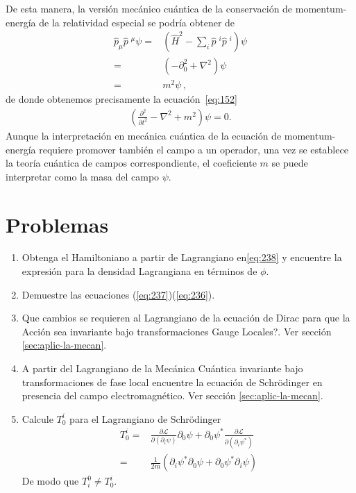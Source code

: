 De esta manera, la versión mecánico cuántica de la conservación de momentum-energía de la relatividad especial se podría obtener de
\begin{align}
  \widehat{p}_{\mu}\widehat{p}\;^{\mu}\psi=&\left( \widehat{H}^{2}-\sum_{i}\widehat{p}\;^i\widehat{p}\;^i \right)\psi \nonumber\\
=&\left( -\partial_0^2+\nabla^2 \right)\psi \nonumber\\
=& m^2 \psi\,,
\end{align}
de donde obtenemos precisamente la ecuación~\eqref{eq:152}
\begin{align}
  \left(
\frac{\partial^2}{\partial t^2}-\nabla^2+m^2
  \right)\psi=0.
\end{align}
Aunque la interpretación en mecánica cuántica de la ecuación de momentum-energía requiere promover también el campo a un operador, una vez se establece la teoría cuántica de campos correspondiente, el coeficiente $m$ se puede interpretar como la masa del campo $\psi$.

\section{Problemas}
\label{sec:problemas-2}
\renewcommand{\labelenumi}{\thechapter.\theenumi} %
\begin{enumerate}
\item Obtenga el Hamiltoniano a partir de Lagrangiano en\eqref{eq:238} y encuentre la expresi\'on para la densidad Lagrangiana en t\'erminos de $\phi$.
\label{item:pch1.0} %
\item Demuestre las ecuaciones (\ref{eq:237})(\ref{eq:236}).
\label{item:pch1.1} %

\item \textquestiondown Que cambios se requieren al Lagrangiano de la ecuaci\'on de Dirac para que la Acci\'on sea invariante bajo transformaciones Gauge Locales?. Ver secci\'on \ref{sec:aplic-la-mecan}.



\label{item:pch1.3} %

\item A partir del Lagrangiano de la Mec\'anica Cu\'antica invariante bajo transformaciones de fase local encuentre la ecuaci\'on de Schr\"odinger en presencia del campo electromagn\'etico. Ver secci\'on \ref{sec:aplic-la-mecan}.
 



\item Calcule $T^i_0$ para el Lagrangiano de Schr\"odinger
  \begin{align}
    T^i_0=&\frac{\partial\mathcal{L}}{\partial(\partial_i \psi)}\partial_0\psi+\partial_0\psi^*\frac{\partial\mathcal{L}}{\partial(\partial_i \psi^*)}\nonumber\\
    =&\frac{1}{2m}\left(\partial_i\psi^*\partial_0\psi+\partial_0\psi^*\partial_i\psi \right)
  \end{align}
De modo que $T^0_i\neq T^i_0$.

\end{enumerate}


\renewcommand{\labelenumi}{\theenumi} %

